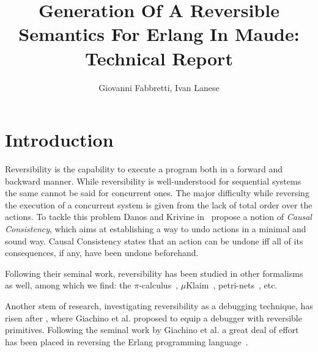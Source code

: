 \documentclass{article}[12pt,a4paper]
\theoremstyle{definition}
\begin{document}
\title{Generation Of A Reversible Semantics For Erlang In Maude: Technical Report}

\author{Giovanni Fabbretti, Ivan Lanese}
\date{}

\maketitle %


\section{Introduction}


Reversibility is the capability to execute a
program both in a forward and backward manner. While reversibility is
well-understood for sequential systems the same cannot be said for concurrent
ones. The major difficulty while reversing the execution of a concurrent system is given from the lack of
total order over the actions. To tackle this problem Danos and Krivine in~\cite{DanosK04} propose a notion of
\emph{Causal Consistency}, which aims at establishing a way to undo actions in a
minimal and sound way. Causal Consistency states that an action can be undone
iff all of its consequences, if any, have been undone beforehand.

Following their seminal work, reversibility has been studied in other formalisms
as well, among which we find: the $\pi$-calculus~\cite{LaneseMS16},
$\mu$Klaim~\cite{GiachinoLMT17}, petri-nets~\cite{PhilippouP18}, etc.

Another stem of research, investigating reversibility as a debugging technique,
has risen after \cite{GiachinoLM14}, where Giachino et al. proposed to
equip a debugger with reversible primitives.
Following the seminal work by Giachino et al. a great deal of effort has been placed in reversing the Erlang programming
language~\cite{LaneseNPV18, FabbrettiLS21}.
\end{document}
